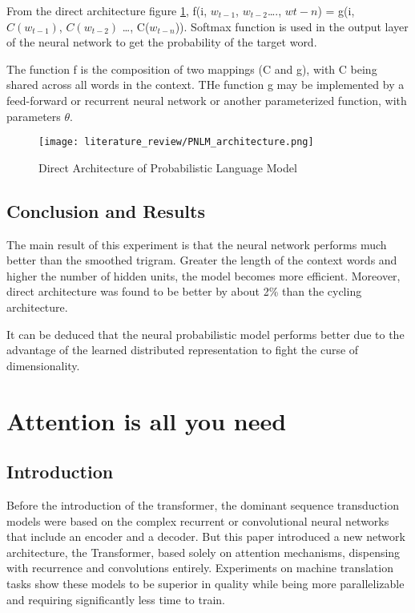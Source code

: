 From the direct architecture figure \ref{fig:Probabilistic Language Model Architecture}, 
f(i, $w_{t - 1}$, $w_{t - 2}$…., $w{t - n}$) = g(i, $C(w_{t - 1})$, $C(w_{t - 2})$ …, C($w_{t - n}$)). Softmax function is used in the output layer of the neural network to get the probability of the target word.

The function f is the composition of two mappings (C and g), with C being shared across all words in the context. THe function g may be implemented by a feed-forward or recurrent neural network or another parameterized function, with parameters $\theta$.

\begin{figure}[H]
    \centering
    \texttt{[image: literature\_review/PNLM\_architecture.png]}
    \caption{Direct Architecture of Probabilistic Language Model}
    \label{fig:Probabilistic Language Model Architecture}
\end{figure}

\subsection{Conclusion and Results}
The main result of this experiment is that the neural network performs much better than the smoothed trigram. Greater the length of the context words and higher the number of hidden units, the model becomes more efficient. Moreover, direct architecture was found to be better by about 2\% than the cycling architecture.

It can be deduced that the neural probabilistic model performs better due to the advantage of the learned distributed representation to fight the curse of dimensionality.

\section{Attention is all you need}
\subsection{Introduction}
Before the introduction of the transformer, the dominant sequence transduction models were based on the complex recurrent or convolutional neural networks that include an encoder and a decoder. But this paper introduced a new network architecture, the Transformer, based solely on attention mechanisms, dispensing with recurrence and convolutions entirely. Experiments on machine translation tasks show these models to be superior in quality while being more parallelizable and requiring significantly less time to train.

